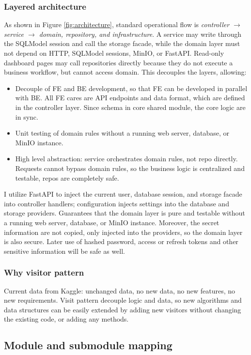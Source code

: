 \documentclass[13pt, a4paper]{article}
\begin{document}
\subsubsection{Layered architecture}
As shown in Figure \ref{fig:architecture}, standard operational flow is \textit{controller $\rightarrow$ service $\rightarrow$ domain,
repository, and infrastructure}. A service may write through the SQLModel session and call the
storage facade, while the domain layer must not depend on HTTP, SQLModel sessions, MinIO, or
FastAPI. Read-only dashboard pages may call repositories directly because they do not execute
a business workflow, but cannot access domain. This decouples the layers, allowing:
\begin{itemize}
    \item Decouple of FE and BE development, so that FE can be developed in parallel with BE. All FE cares are API endpoints and data format, 
    which are defined in the controller layer. Since schema in core shared module, the core logic are in sync.
    \item Unit testing of domain rules without a running web server, database, or MinIO instance.
    \item High level abstraction: service orchestrates domain rules, not repo directly. Requests cannot bypass domain rules, 
    so the business logic is centralized and testable, repos are completely safe.
\end{itemize}

I utilize FastAPI to inject the current user, database session, and storage facade
into controller handlers; configuration injects settings into the database and storage
providers. Guarantees that the domain layer is pure and testable without a running web server, database, or MinIO instance.
Moreover, the secret information are not copied, only injected into the providers, so the domain layer is also secure. Later use 
of hashed password, access or refresh tokens and other sensitive information will be safe as well.
\subsubsection{Why visitor pattern}
Current data from Kaggle: unchanged data, no new data, no new features, no new requirements. Visit pattern decouple logic and data, 
so new algorithms and data structures can be easily extended by adding new visitors without 
changing the existing code, or adding any methods.

\subsection{Module and submodule mapping}
\end{document}
